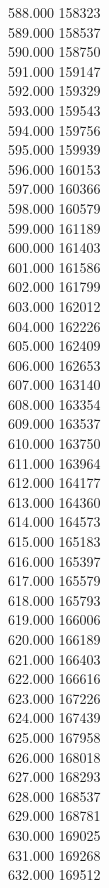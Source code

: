 { 588.000	158323 \\
 589.000	158537 \\
 590.000	158750 \\
 591.000	159147 \\
 592.000	159329 \\
 593.000	159543 \\
 594.000	159756 \\
 595.000	159939 \\
 596.000	160153 \\
 597.000	160366 \\
 598.000	160579 \\
 599.000	161189 \\
 600.000	161403 \\
 601.000	161586 \\
 602.000	161799 \\
 603.000	162012 \\
 604.000	162226 \\
 605.000	162409 \\
 606.000	162653 \\
 607.000	163140 \\
 608.000	163354 \\
 609.000	163537 \\
 610.000	163750 \\
 611.000	163964 \\
 612.000	164177 \\
 613.000	164360 \\
 614.000	164573 \\
 615.000	165183 \\
 616.000	165397 \\
 617.000	165579 \\
 618.000	165793 \\
 619.000	166006 \\
 620.000	166189 \\
 621.000	166403 \\
 622.000	166616 \\
 623.000	167226 \\
 624.000	167439 \\
 625.000	167958 \\
 626.000	168018 \\
 627.000	168293 \\
 628.000	168537 \\
 629.000	168781 \\
 630.000	169025 \\
 631.000	169268 \\
 632.000	169512 \\
}
